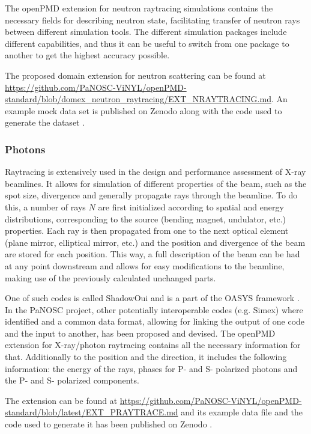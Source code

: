 \documentclass[11pt, a4paper]{article}
\begin{document}
The openPMD extension for neutron raytracing simulations contains the necessary fields for describing neutron state, 
facilitating transfer of neutron rays between different simulation tools. The different simulation packages include different 
capabilities, and thus it can be useful to switch from one package to another to get the highest accuracy possible.

The proposed domain extension for neutron scattering can be found at \url{https://github.com/PaNOSC-ViNYL/openPMD-standard/blob/domex_neutron_raytracing/EXT_NRAYTRACING.md}.
An example mock data set is published on Zenodo along with the code used to generate the dataset \cite{Bertelsen:zenodo2019}.

\subsubsection{Photons}
Raytracing is extensively used in the design and performance assessment of X-ray beamlines. It allows for simulation of different properties of the beam, such as the spot size, divergence and generally propagate rays through the beamline. To do this, a number of rays $N$ are first initialized according to spatial and energy distributions, corresponding to the source (bending magnet, undulator, etc.) properties. Each ray is then propagated from one to the next optical element (plane mirror, elliptical mirror, etc.) and the position and divergence of the beam are stored for each position. This way, a full description of the beam can be had at any point downstream and allows for easy modifications to the beamline, making use of the previously calculated unchanged parts.

One of such codes is called ShadowOui and is a part of the OASYS framework \cite{Rebuffi2016}. In the PaNOSC project, other potentially interoperable codes (e.g. Simex) where identified and a common data format, allowing for linking the output of one code and the input to another, has been proposed and devised. The openPMD extension for X-ray/photon raytracing contains all the necessary information for that. Additionally to the position and the direction, it includes the following information: the energy of the rays, phases for P- and S- polarized photons and the P- and S- polarized components.

The extension can be found at \url{https://github.com/PaNOSC-ViNYL/openPMD-standard/blob/latest/EXT_PRAYTRACE.md} and its example data file and the code used to generate it has been published on Zenodo \cite{Hafner:zenodo2019}.
\end{document}
